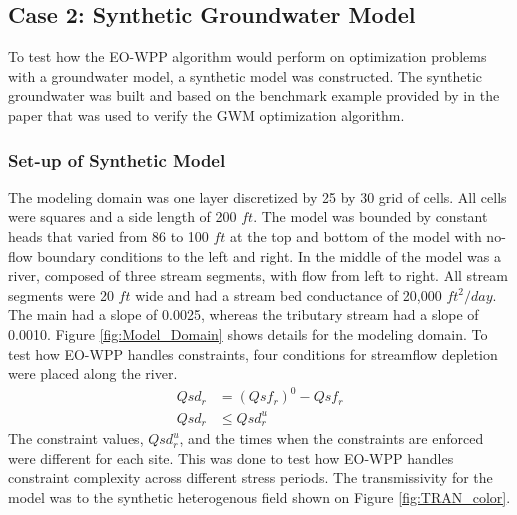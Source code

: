 \documentclass[authoryear]{elsarticle}
\begin{document}
\subsection{Case 2: Synthetic Groundwater Model}
To test how the EO-WPP algorithm would perform on optimization problems with a groundwater model, a synthetic model was constructed. The synthetic groundwater was built and based on the benchmark example provided by \cite{ahlfeld2005gwm} in the paper that was used to verify the GWM optimization algorithm.
\subsubsection{Set-up of Synthetic Model}
The modeling domain was one layer discretized by 25 by 30 grid of cells. All cells were squares and  a side length of 200 $ft$. The model was bounded by constant heads that varied from 86 to 100 $ft$ at the top and bottom of the model with no-flow boundary conditions to the left and right. In the middle of the model was a river, composed of three stream segments, with flow from left to right. All stream segments were 20 $ft$ wide and had a stream bed conductance of 20,000 $ft^2/day$. The main  had a slope of 0.0025, whereas the tributary stream had a slope of 0.0010. Figure \ref{fig:Model_Domain} shows details for the modeling domain. To test how EO-WPP handles constraints, four conditions for streamflow depletion were placed along the river. 
\begin{align}
  Qsd_{r} &= (Qsf_{r})^{0} - Qsf_{r}\\
  Qsd_{r} &\leq Qsd^{u}_{r}
\end{align}
 The  constraint values, $Qsd^{u}_{r}$, and the times when the constraints are enforced were different for each site. This was done to test how EO-WPP handles constraint complexity across different stress periods. The transmissivity for the model was  to the synthetic heterogenous field shown on Figure \ref{fig:TRAN_color}.
\end{document}
